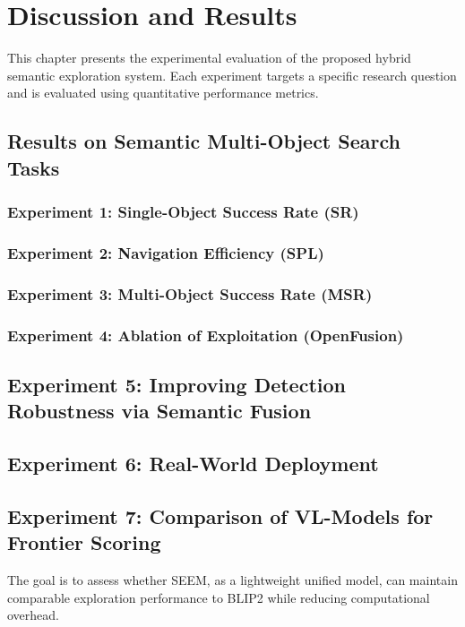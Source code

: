\chapter{Discussion and Results}
This chapter presents the experimental evaluation of the proposed hybrid semantic exploration system. Each experiment targets a specific research question and is evaluated using quantitative performance metrics.

\section{Results on Semantic Multi-Object Search Tasks}

\subsection{Experiment 1: Single-Object Success Rate (SR)}

\subsection{Experiment 2: Navigation Efficiency (SPL)}

\subsection{Experiment 3: Multi-Object Success Rate (MSR)}

\subsection{Experiment 4: Ablation of Exploitation (OpenFusion)}

\section{Experiment 5: Improving Detection Robustness via Semantic Fusion}

\section{Experiment 6: Real-World Deployment}

\section{Experiment 7: Comparison of VL-Models for Frontier Scoring}
The goal is to assess whether SEEM, as a lightweight unified model, can maintain comparable exploration performance to BLIP2 while reducing computational overhead.